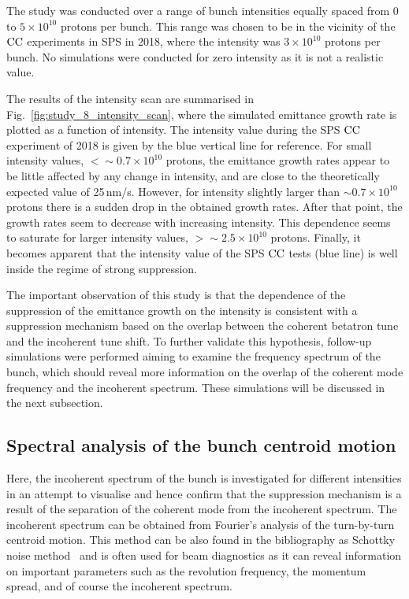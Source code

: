  The study was conducted over a range of bunch intensities equally spaced from 0 to $5 \times 10^{10}$ protons per bunch. This range was chosen to be in the vicinity of the ${\mathrm{CC}}$ experiments in SPS in 2018, where the intensity was $3 \times 10^{10}$ protons per bunch. No simulations were conducted for zero intensity as it is not a realistic value.

 The results of the intensity scan are summarised in Fig.~\ref{fig:study_8_intensity_scan}, where the simulated emittance growth rate is plotted as a function of intensity. The intensity value during the SPS ${\mathrm{CC}}$ experiment of 2018 is given by the blue vertical line for reference. For small intensity values, $< \sim 0.7\times 10^{10}$ protons, the emittance growth rates appear to be little affected by any change in intensity, and are close to the theoretically expected value of 25\,nm/s. However, for intensity slightly larger than $\sim 0.7 \times 10^{10}$ protons there is a sudden drop in the obtained growth rates. After that point, the growth rates seem to decrease with increasing intensity. This dependence seems to saturate for larger intensity values, $>\sim 2.5 \times 10^{10}$ protons. Finally, it becomes apparent that the intensity value of the SPS ${\mathrm{CC}}$ tests (blue line) is well inside the regime of strong suppression.

The important observation of this study is that the dependence of the suppression of the emittance growth on the intensity is consistent with a suppression mechanism based on the overlap between the coherent betatron tune and the incoherent tune shift. To further validate this hypothesis, follow-up simulations were performed aiming to examine the frequency spectrum of the bunch, which should reveal more information on the overlap of the coherent mode frequency and the incoherent spectrum. These simulations will be discussed in the next subsection.



\subsection{Spectral analysis of the bunch centroid motion}\label{subsec:spectral_analysis_schottky}
Here, the incoherent spectrum of the bunch is investigated for different intensities in an attempt to visualise and hence confirm that the suppression mechanism is a result of the separation of the coherent mode from the incoherent spectrum. The incoherent spectrum can be obtained from Fourier's analysis of the turn-by-turn centroid motion. This method can be also found in the bibliography as Schottky noise method~\cite{Caspers:1213284} and is often used for beam diagnostics as it can reveal information on important parameters such as the revolution frequency, the momentum spread, and of course the incoherent spectrum.

